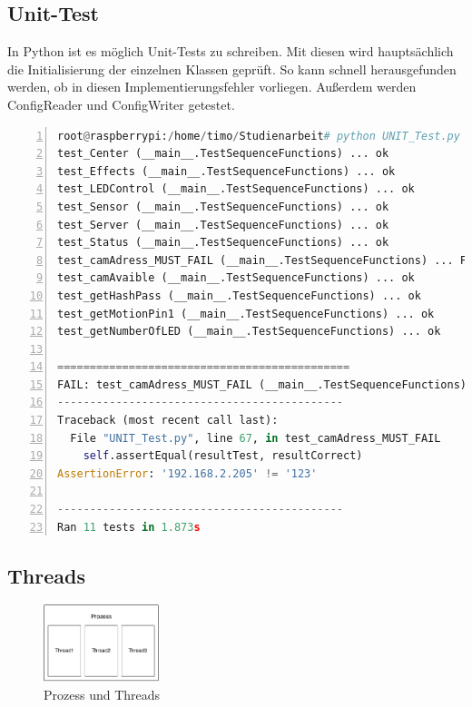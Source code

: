 \subsection{Unit-Test}
In Python ist es möglich Unit-Tests\cite{unittest} zu schreiben. Mit diesen wird hauptsächlich die Initialisierung der einzelnen Klassen geprüft. So kann schnell herausgefunden werden, ob in diesen Implementierungsfehler vorliegen. Außerdem werden ConfigReader und ConfigWriter getestet. \\

\begin{lstlisting}[caption=Ausgabe der Klasse UNIT\_Test, language=python, frame=single, breaklines=true,columns=fullflexible, commentstyle=\color{gray}\upshape, captionpos=b, numbers = left]
root@raspberrypi:/home/timo/Studienarbeit# python UNIT_Test.py 
test_Center (__main__.TestSequenceFunctions) ... ok
test_Effects (__main__.TestSequenceFunctions) ... ok
test_LEDControl (__main__.TestSequenceFunctions) ... ok
test_Sensor (__main__.TestSequenceFunctions) ... ok
test_Server (__main__.TestSequenceFunctions) ... ok
test_Status (__main__.TestSequenceFunctions) ... ok
test_camAdress_MUST_FAIL (__main__.TestSequenceFunctions) ... FAIL
test_camAvaible (__main__.TestSequenceFunctions) ... ok
test_getHashPass (__main__.TestSequenceFunctions) ... ok
test_getMotionPin1 (__main__.TestSequenceFunctions) ... ok
test_getNumberOfLED (__main__.TestSequenceFunctions) ... ok

=============================================
FAIL: test_camAdress_MUST_FAIL (__main__.TestSequenceFunctions)
--------------------------------------------
Traceback (most recent call last):
  File "UNIT_Test.py", line 67, in test_camAdress_MUST_FAIL
    self.assertEqual(resultTest, resultCorrect)
AssertionError: '192.168.2.205' != '123'

--------------------------------------------
Ran 11 tests in 1.873s
\end{lstlisting}
\subsection{Threads}

\begin{figure}
	\vspace{-30pt}
	\begin{center}
		\includegraphics[width=0.3\textwidth]{./data/Threads.png}
	\end{center}
	\vspace{-20pt}
	\caption{Prozess und Threads}
	\vspace{-60pt}
\end{figure}

